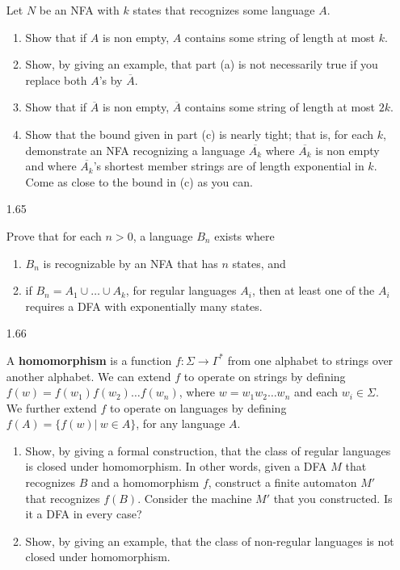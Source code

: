 \begin{enumerate}
            Let $N$ be an NFA with $k$ states that recognizes some language $A$.
            \begin{enumerate}
                  \item Show that if $A$ is non empty, $A$ contains some string of length at most $k$.
                  \item Show, by giving an example, that part (a) is not necessarily true if you replace both $A$’s by $\overline{A}$.
                  \item Show that if $\overline{A}$ is non empty, $\overline{A}$ contains some string of length at most $2k$.
                  \item Show that the bound given in part (c) is nearly tight; that is, for each $k$, demonstrate an NFA recognizing a language $\overline{A_k}$ where $\overline{A_k}$ is non empty and where $\overline{A_k}$’s shortest member strings are of length exponential in $k$. Come as close to the bound in (c) as you can.
            \end{enumerate}
            
      \item [1.65]
            
            Prove that for each $n > 0$, a language $B_n$ exists where
            \begin{enumerate}
                  \item $B_n$ is recognizable by an NFA that has $n$ states, and
                  \item if $B_n = A_1 \cup \ldots \cup A_k$, for regular languages $A_i$, then at least one of the $A_i$ requires a DFA with exponentially many states.
            \end{enumerate}
            
      \item [1.66]
            
            A \textbf{homomorphism} is a function $f: \Sigma \longrightarrow \Gamma^\ast$ from one alphabet to strings over another alphabet. We can extend $f$ to operate on strings by defining $f(w)= f(w_1)f(w_2) \ldots f(w_n)$, where $w = w_1 w_2 \ldots w_n$ and each $w_i \in \Sigma$. We further extend $f$ to operate on languages by defining $f(A)=\{f(w)|~ w \in A\}$, for any language $A$.
            
            \begin{enumerate}
                  \item Show, by giving a formal construction, that the class of regular languages is closed under homomorphism. In other words, given a DFA $M$ that recognizes $B$ and a homomorphism $f$, construct a finite automaton $M'$ that recognizes $f(B)$. Consider the machine $M'$ that you constructed. Is it a DFA in every case?
                  \item Show, by giving an example, that the class of non-regular languages is not closed under homomorphism.
            \end{enumerate}
            

\end{enumerate}
